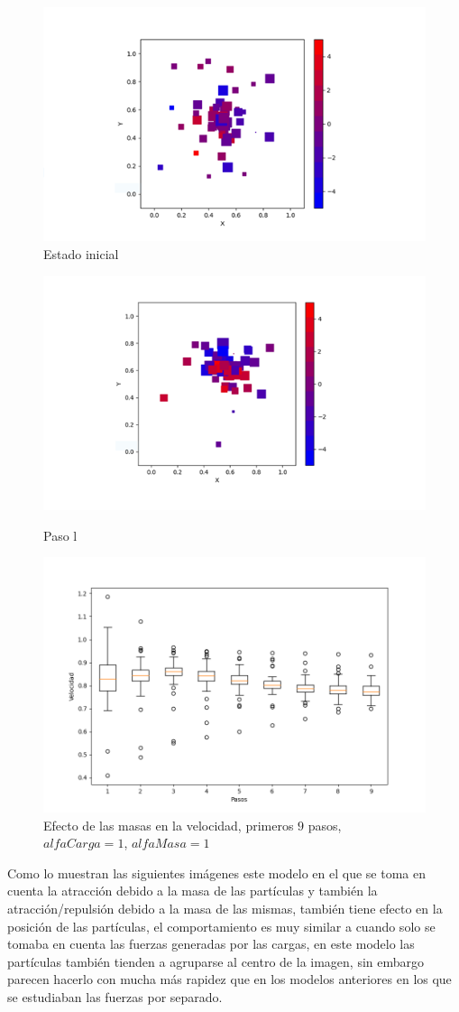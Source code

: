\documentclass{article}
\begin{document}
			\begin{figure}[h!]
		\centering
		\includegraphics[width=0.8\linewidth]{Figure_5.png}
		\caption{Estado inicial}
		\label{fig:imagen5}
	\end{figure}
	\newpage
			\begin{figure}[h!]
		\centering
		\includegraphics[width=0.9\linewidth]{Figure_6.png}
		\caption{Paso l}
		\label{fig:imagen6}

		\centering
		\includegraphics[width=0.8\linewidth]{bx_3.png}
		\caption{Efecto de las masas en la velocidad, primeros $9$ pasos, $alfaCarga=1$, $alfaMasa=1$}
		\label{fig:bx3}
	\end{figure}
	\newpage
	Como lo muestran las siguientes imágenes este modelo en el que se toma en cuenta la atracción debido a la masa de las partículas y también la atracción/repulsión debido a la masa de las mismas, también tiene efecto en la posición de las partículas, el comportamiento es muy similar a cuando solo se tomaba en cuenta las fuerzas generadas por las cargas, en este modelo las partículas también tienden a agruparse al centro de la imagen, sin embargo parecen hacerlo con mucha más rapidez que en los modelos anteriores en los que se estudiaban las fuerzas por separado.
\end{document}
